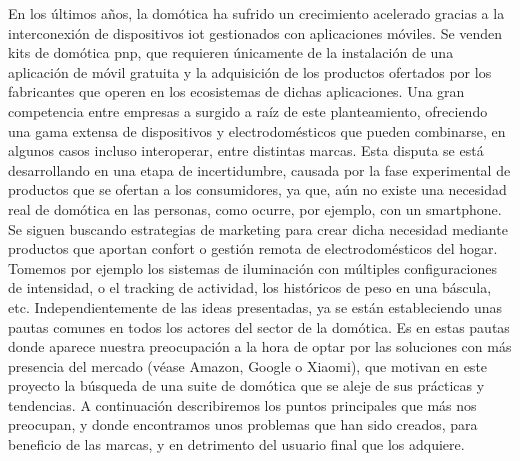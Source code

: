 En los últimos años, la domótica ha sufrido un crecimiento acelerado gracias a la interconexión de dispositivos \gls{iot} gestionados con aplicaciones móviles. Se venden kits de domótica \Gls{pnp}, que requieren únicamente de la instalación de una aplicación de móvil gratuita y la adquisición de los productos ofertados por los fabricantes que operen en los ecosistemas de dichas aplicaciones. Una gran competencia entre empresas a surgido a raíz de este planteamiento, ofreciendo una gama extensa de dispositivos y electrodomésticos que pueden combinarse, en algunos casos incluso interoperar, entre distintas marcas. Esta disputa se está desarrollando en una etapa de incertidumbre, causada por la fase experimental de productos que se ofertan a los consumidores, ya que, aún no existe una necesidad real de domótica en las personas, como ocurre, por ejemplo, con un \gls{smartphone}. Se siguen buscando estrategias de marketing para crear dicha necesidad mediante productos que aportan confort o gestión remota de electrodomésticos del hogar. Tomemos por ejemplo los sistemas de iluminación con múltiples configuraciones de intensidad, o el tracking de actividad, los históricos de peso en una báscula, etc. Independientemente de las ideas presentadas, ya se están estableciendo unas pautas comunes en todos los actores del sector de la domótica. Es en estas pautas donde aparece nuestra preocupación a la hora de optar por las soluciones con más presencia del mercado (véase Amazon, Google o Xiaomi), que motivan en este proyecto la búsqueda de una suite de domótica que se aleje de sus prácticas y tendencias. A continuación describiremos los puntos principales que más nos preocupan, y donde encontramos unos problemas que han sido creados, para beneficio de las marcas, y en detrimento del usuario final que los adquiere.

\vspace{1cm}

